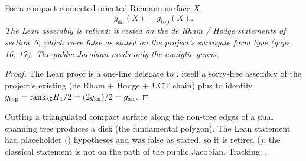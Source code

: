 \begin{theorem}
\label{thm:analytic-eq-topological-genus}
For a compact connected oriented Riemann surface \(X\),
\[
  g_{\mathrm{an}}(X) = g_{\mathrm{top}}(X).
\]
\textit{The Lean assembly is retired: it rested on the de Rham / Hodge statements of
section~6, which were false as stated on the project's surrogate form type (gaps 16, 17).
The public Jacobian needs only the analytic genus.}
\end{theorem}
\begin{proof}\leanok
The Lean proof is a one-line delegate to
, itself a sorry-free assembly
of the project's existing
 (de Rham +
Hodge + UCT chain) plus  to identify
\(g_{\mathrm{top}} = \mathrm{rank}_{\Z} H_1 / 2 = (2 g_{\mathrm{an}}) / 2 = g_{\mathrm{an}}\).
\end{proof}


\begin{lemma}
\label{lem:cut-along-non-tree-yields-unfolded-disk}
Cutting a triangulated compact surface along the non-tree edges of a dual
spanning tree produces a disk (the fundamental polygon). The Lean statement had
placeholder () hypotheses and was false as stated, so it is retired
(); the classical statement is not on the path of the public Jacobian.
Tracking: .
\end{lemma}

